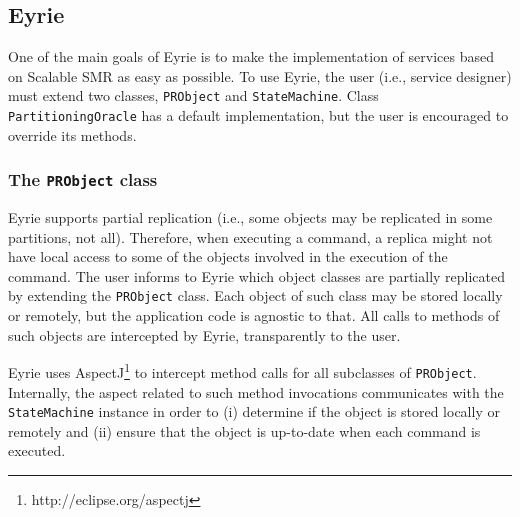 \documentclass[10pt, conference, compsocconf, letterpaper]{IEEEtranv17}
\begin{document}
\subsection{Eyrie}
\label{sec:libjssmr}

One of the main goals of Eyrie is to make the implementation of services based on Scalable SMR as easy as possible. 
To use Eyrie, the user (i.e., service designer) must extend two classes, \verb#PRObject# and \verb#StateMachine#. 
Class \verb#PartitioningOracle# has a default implementation, but the user is encouraged to override its methods. 



\subsubsection{The \texttt{PRObject} class}

Eyrie supports partial replication (i.e., some objects may be replicated in some partitions, not all). 
Therefore, when executing a command, a replica might not have local access to some of the objects involved in the execution of the command. 
%
The user informs to Eyrie which object classes are partially replicated by extending the \verb#PRObject# class. Each object of such class may be stored locally or remotely, but the application code is agnostic to that. All calls to methods of such objects are intercepted by Eyrie, transparently to the user.


Eyrie uses AspectJ\footnote{http://eclipse.org/aspectj} to intercept method calls for all subclasses of \verb#PRObject#. 
Internally, the aspect related to such method invocations communicates with the \verb#StateMachine# instance in order to (i) determine if the object is stored locally or remotely and (ii) ensure that the object is up-to-date when each command is executed.
\end{document}
